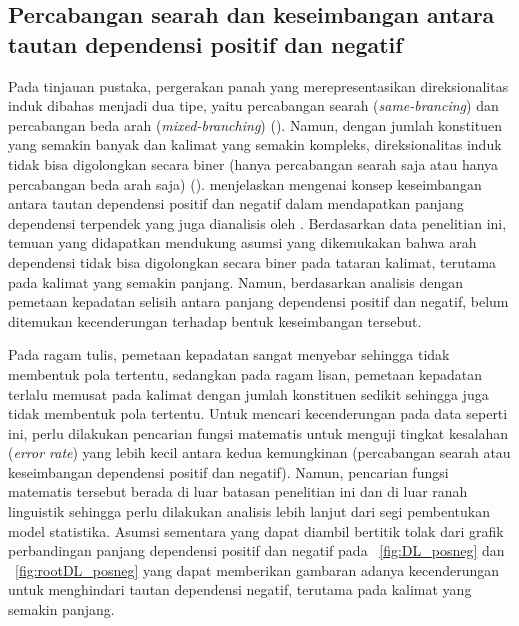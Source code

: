 \documentclass[10pt, a4paper, conference, compsocconf]{IEEEtran}
\begin{document}
\subsection{Percabangan searah dan keseimbangan antara tautan dependensi positif dan negatif}
Pada tinjauan pustaka, pergerakan panah yang merepresentasikan direksionalitas induk dibahas menjadi dua tipe, yaitu percabangan searah (\textit{same-brancing}) dan percabangan beda arah (\textit{mixed-branching}) (\citealp{hawkins1994performance, frazier1985syntactic}). Namun, dengan jumlah konstituen yang semakin banyak dan kalimat yang semakin kompleks, direksionalitas induk tidak bisa digolongkan secara biner (hanya percabangan searah saja atau hanya percabangan beda arah saja) (\citealp{dryer1992greenbergian, temperley2008dependency}). \cite{gildea2010grammars} menjelaskan mengenai konsep keseimbangan antara tautan dependensi positif dan negatif dalam mendapatkan panjang dependensi terpendek yang juga dianalisis oleh \citep{dryer1992greenbergian}. Berdasarkan data penelitian ini, temuan yang didapatkan mendukung asumsi yang dikemukakan \cite{dryer1992greenbergian} bahwa arah dependensi tidak bisa digolongkan secara biner pada tataran kalimat, terutama pada kalimat yang semakin panjang. Namun, berdasarkan analisis dengan pemetaan kepadatan selisih antara panjang dependensi positif dan negatif, belum ditemukan kecenderungan terhadap bentuk keseimbangan tersebut. 

Pada ragam tulis, pemetaan kepadatan sangat menyebar sehingga tidak membentuk pola tertentu, sedangkan pada ragam lisan, pemetaan kepadatan terlalu memusat pada kalimat dengan jumlah konstituen sedikit sehingga juga tidak membentuk pola tertentu. Untuk mencari kecenderungan pada data seperti ini, perlu dilakukan pencarian fungsi matematis untuk menguji tingkat kesalahan (\textit{error rate}) yang lebih kecil antara kedua kemungkinan (percabangan searah atau keseimbangan dependensi positif dan negatif). Namun, pencarian fungsi matematis tersebut berada di luar batasan penelitian ini dan di luar ranah linguistik sehingga perlu dilakukan analisis lebih lanjut dari segi pembentukan model statistika. Asumsi sementara yang dapat diambil bertitik tolak dari grafik perbandingan panjang dependensi positif dan negatif pada \pic~\ref{fig:DL_posneg} dan \pic~\ref{fig:rootDL_posneg} yang dapat memberikan gambaran adanya kecenderungan untuk menghindari tautan dependensi negatif, terutama pada kalimat yang semakin panjang.
\end{document}

